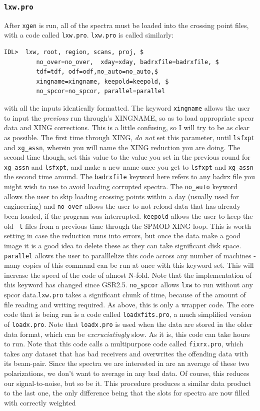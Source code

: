 \documentclass[11pt]{article}
\begin{document}
\subsubsection{\texttt{lxw.pro}}
 After \texttt{xgen} is run, all of the spectra must be loaded into the crossing point files, with a code called \texttt{lxw.pro}. \texttt{lxw.pro} is called similarly:
\begin{verbatim}
IDL>  lxw, root, region, scans, proj, $
         no_over=no_over,  xday=xday, badrxfile=badrxfile, $
         tdf=tdf, odf=odf,no_auto=no_auto,$
         xingname=xingname, keepold=keepold, $
         no_spcor=no_spcor, parallel=parallel
\end{verbatim}
with all the inputs identically formatted. The keyword \texttt{xingname} allows the user to input the {\it previous} run through's XINGNAME, so as to load appropriate spcor data and XING corrections. This is a little confusing, so I will try to be as clear as possible. The first time through XING, {\it do not} set this parameter, until \texttt{lsfxpt} and \texttt{xg\_assn}, wherein you will name the XING reduction you are doing. The second time though, set this value to the value you set in the previous round for \texttt{xg\_assn} and \texttt{lsfxpt}, and make a new name once you get to \texttt{lsfxpt} and \texttt{xg\_assn} the second time around. The \texttt{badrxfile} keyword here refers to any badrx file you might wish to use to avoid loading corrupted spectra. The \texttt{no\_auto} keyword allows the user to skip loading crossing points within a day (usually used for engineering) and \texttt{no\_over} allows the user to not reload data that has already been loaded, if the program was interrupted. \texttt{keepold} allows the user to keep the old \texttt{\_l} files from a previous time through the SPMOD-XING loop. This is worth setting in case the reduction runs into errors, but once the data make a good image it is a good idea to delete these as they can take significant disk space. \texttt{parallel} allows the user to paralllelize this code across any number of machines -many copies of this command can be run at once with this keyword set. This will increase the speed of the code of almost N-fold. Note that the implementation of this keyword has changed since GSR2.5. \texttt{no\_spcor} allows \texttt{lxw} to run without any spcor data.\texttt{lxw.pro} takes a significant chunk of time, because of the amount of file reading and writing required. As above, this is only a wrapper code. The core code that is being run is a code called \texttt{loadxfits.pro}, a much simplified version of \texttt{loadx.pro}. Note that \texttt{loadx.pro} is used when the data are stored in the older data format, which can be {\it excruciatingly} slow. As it is, this code can take hours to run. Note that this code calls a multipurpose code called \texttt{fixrx.pro}, which takes any dataset that has bad receivers and overwrites the offending data with its beam-pair. Since the spectra we are interested in are an average of these two polarizations, we don't want to average in any bad data. Of course, this reduces our signal-to-noise, but so be it. This procedure produces a similar data product to the last one, the only difference being that the slots for spectra are now filled with correctly weighted 
\end{document}
